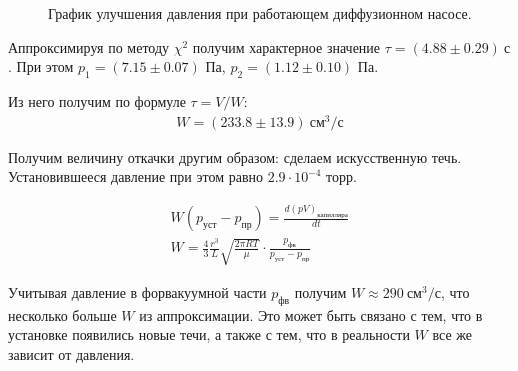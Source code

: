 \documentclass[a4paper,12pt]{report}
\begin{document}
\begin{multicols}{2}
        \begin{figure}[H]
            \centering
            \caption{График улучшения давления при работающем диффузионном насосе.}
        \end{figure}

        Аппроксимируя по методу $\chi^2$ получим характерное значение $\tau = (4.88\pm 0.29) \ \text{с}$. При этом $p_1 = (7.15\pm 0.07)$ Па, $p_2 = (1.12 \pm 0.10)$ Па.

        Из него получим по формуле $\tau = V/W$:
        \begin{gather*}
            W=(233.8 \pm 13.9) \ \text{см}^3/\text{с}
        \end{gather*}

        Получим величину откачки другим образом: сделаем искусственную течь. Установившееся давление при этом равно $2.9\cdot 10^{-4}$ торр.
        
        \begin{gather*}
            W(p_\text{уст}-p_\text{пр})=\frac{d(pV)_\text{капилляра}}{dt} \\
            W=\frac{4}{3}\frac{r^3}{L}\sqrt{\frac{2\pi R T}{\mu}}\cdot\frac{p_\text{фв}}{p_\text{уст}-p_\text{пр}}
        \end{gather*}

        Учитывая давление в форвакуумной части $p_\text{фв}$ получим $W\approx 290 \ \text{см}^3/\text{с}$, что несколько больше $W$ из аппроксимации. Это может быть связано с тем, что в установке появились новые течи, а также с тем, что в реальности $W$ все же зависит от давления.
        

\end{multicols}
\end{document}
